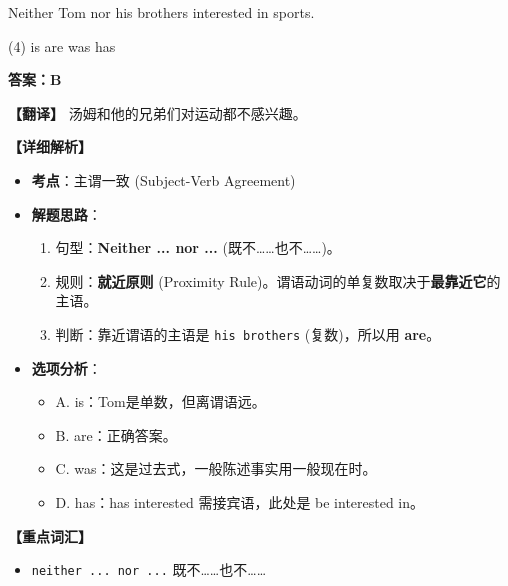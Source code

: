 \documentclass[11pt, a4paper]{article}
\newcommand{\analysis}[4]{
    \begin{solutionbox}
        \textbf{答案：#1}
        
        \textbf{【翻译】} #2
        
        \textbf{【详细解析】}
        #3
        
        \textbf{【重点词汇】}
        #4
    \end{solutionbox}
}
\newcommand{\blank}{\underline{\hspace{1.5cm}}}
\begin{document}
\begin{questions}
    \item Neither Tom nor his brothers \blank interested in sports.
    \begin{tasks}(4)
        \task is \task are \task was \task has
    \end{tasks}
    \analysis{B}{汤姆和他的兄弟们对运动都不感兴趣。}{
        \begin{itemize}
            \item \textbf{考点}：主谓一致 (Subject-Verb Agreement)
            \item \textbf{解题思路}：
                \begin{enumerate}
                    \item 句型：\textbf{Neither ... nor ...} (既不……也不……)。
                    \item 规则：\textbf{就近原则} (Proximity Rule)。谓语动词的单复数取决于\textbf{最靠近它}的主语。
                    \item 判断：靠近谓语的主语是 \texttt{his brothers} (复数)，所以用 \textbf{are}。
                \end{enumerate}
            \item \textbf{选项分析}：
                \begin{itemize}
                    \item A. is：Tom是单数，但离谓语远。
                    \item B. are：正确答案。
                    \item C. was：这是过去式，一般陈述事实用一般现在时。
                    \item D. has：has interested 需接宾语，此处是 be interested in。
                \end{itemize}
        \end{itemize}
    }{
        \begin{itemize}
            \item \texttt{neither ... nor ...} 既不……也不……
        \end{itemize}
    }


\end{questions}
\end{document}
